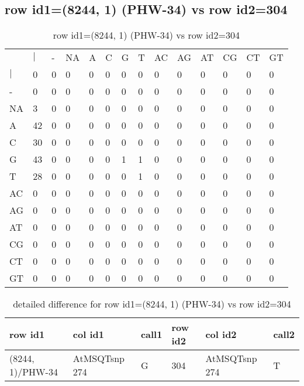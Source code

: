 \subsection{row id1=(8244, 1) (PHW-34) vs row id2=304}
\begin{center}
\begin{longtable}{|l|l|l|l|l|l|l|l|l|l|l|l|l|l|}
\caption{row id1=(8244, 1) (PHW-34) vs row id2=304} \label{table_dm178}\\
\hline
\\
\hline
&$|$&-&NA&A&C&G&T&AC&AG&AT&CG&CT&GT\\
$|$&0&0&0&0&0&0&0&0&0&0&0&0&0\\
-&0&0&0&0&0&0&0&0&0&0&0&0&0\\
NA&3&0&0&0&0&0&0&0&0&0&0&0&0\\
A&42&0&0&0&0&0&0&0&0&0&0&0&0\\
C&30&0&0&0&0&0&0&0&0&0&0&0&0\\
G&43&0&0&0&0&1&1&0&0&0&0&0&0\\
T&28&0&0&0&0&0&1&0&0&0&0&0&0\\
AC&0&0&0&0&0&0&0&0&0&0&0&0&0\\
AG&0&0&0&0&0&0&0&0&0&0&0&0&0\\
AT&0&0&0&0&0&0&0&0&0&0&0&0&0\\
CG&0&0&0&0&0&0&0&0&0&0&0&0&0\\
CT&0&0&0&0&0&0&0&0&0&0&0&0&0\\
GT&0&0&0&0&0&0&0&0&0&0&0&0&0\\
\hline
\end{longtable}
\end{center}

\begin{center}
\begin{longtable}{|l|l|l|l|l|l|}
\caption{detailed difference for row id1=(8244, 1) (PHW-34) vs row id2=304} \label{table_dm179}\\
\hline
row id1&col id1&call1&row id2&col id2&call2\\
\hline
(8244, 1)/PHW-34&AtMSQTsnp 274&G&304&AtMSQTsnp 274&T\\
\hline
\end{longtable}
\end{center}

